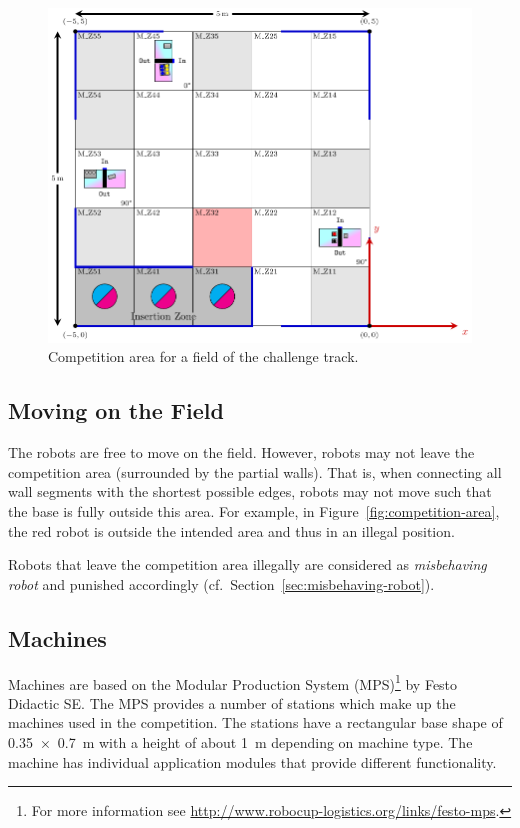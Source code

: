 \documentclass[12pt,twoside]{article}
\newcommand{\refsec}[1]{Section~\ref{#1}}
\newcommand{\reffig}[1]{Figure~\ref{#1}}
\begin{document}
\begin{figure}[!ht]
    \includegraphics{challenge-field2021.pdf}
    \vspace{1ex}
    \caption{%
      Competition area for a field of the challenge track.
    }
    \label{fig:competition-area-challenges}
\end{figure}


\subsection{Moving on the Field}
\label{sec:field-movement}
The robots are free to move on the field. However, robots may not
leave the competition area (surrounded by the partial walls). That is, when
connecting all wall segments with the shortest possible edges, robots
may not move such that the base is fully outside this area. For
example, in \reffig{fig:competition-area}, the red robot is outside
the intended area and thus in an illegal position.

Robots that leave the competition area illegally are considered as
\emph{misbehaving robot} and punished accordingly
(cf.~\refsec{sec:misbehaving-robot}).

\subsection{Machines}
\label{sec:machines}
Machines are based on the Modular Production System (MPS)\footnote{For
  more information see
  \url{http://www.robocup-logistics.org/links/festo-mps}.} by Festo
Didactic SE\@. The MPS provides a number of stations which
make up the machines used in the competition. The stations have a
rectangular base shape of \SI{0,35 x 0,7}{\metre} with a height of %
about \SI{1}{\metre} depending on machine type. The machine
has individual application modules that provide different
functionality.
\end{document}
